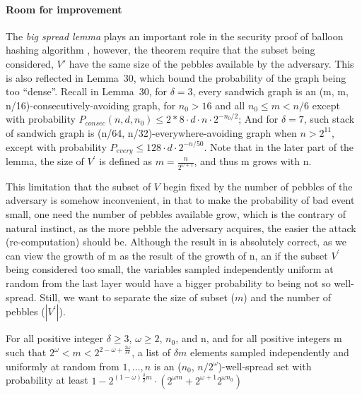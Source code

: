 \paragraph{Room for improvement}
The \textit{big spread lemma} plays an important role in the security proof of balloon hashing algorithm \cite{corrigan2016balloon},
however, the theorem require that the subset being considered, $V\prime$ have the same size of the pebbles available by the adversary.
This is also reflected in Lemma~30, which bound the probability of the graph being too ``dense''. Recall in Lemma~30, for $\delta=3$,
every sandwich graph is an (m, m, n/16)-consecutively-avoiding graph, for $n_0 > 16$ and all $n_0 \leq m < n/6$ except with
probability $P_{consec}(n, d, n_0) \leq 2*8 \cdot d \cdot n \cdot 2^{-n_0/2}$; And for $\delta=7$, such stack of sandwich graph is
(n/64, n/32)-everywhere-avoiding graph when $n > 2^{11}$, except with probability $P_{every} \leq 128\cdot d\cdot 2^{-n/50}$.
Note that in the later part of the lemma, the size of $V^\prime$ is defined as $m=\frac{n}{2^{\omega+1}}$, and thus m grows with
n.

This limitation that the subset of $V$ begin fixed by the number of pebbles of the adversary is somehow inconvenient, in that to make
the probability of bad event small, one need the number of pebbles available grow, which is the contrary of natural instinct, as
the more pebble the adversary acquires, the easier the attack (re-computation) should be. Although the result in \cite{corrigan2016balloon}
is absolutely correct, as we can view the growth of m as the result of the growth of n, an if the subset $V^\prime$ being considered too
small, the variables sampled independently uniform at random from the last layer would have a bigger probability to being not so well-spread.
Still, we want to separate the size of subset ($m$) and the number of pebbles ($|V^\prime|$).

\begin{lemma}\label{lemma::bigspreadvar}
  For all positive integer $\delta \geq 3$, $\omega \geq 2$, $n_0$, and n, and for all positive integers m such that
  $2^\omega < m < 2^{2-\omega+\frac{2\omega}{\delta e}}$, a list of $\delta m$ elements sampled independently and uniformly at random from
  ${1,\ldots,n}$ is an ($n_0$, $n/2^\omega$)-well-spread set with probability at least
  $1-2^{(1-\omega)\frac{\delta}{2}m} \cdot (2^{\omega m}+2^{\omega+1}2^{\omega n_0})$
\end{lemma}


